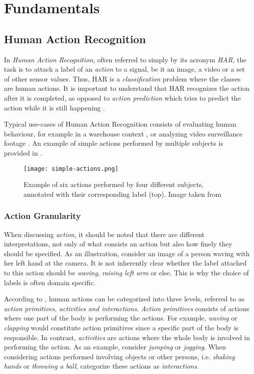 \chapter{Fundamentals}

\section{Human Action Recognition}
In \textit{Human Action Recognition}, often referred to simply by its acronym \textit{HAR}, the task is to attach a label of an \textit{action} to a signal, be it an image, a video or a set of other sensor values.
Thus, HAR is a \textit{classification} problem where the classes are human actions.
It is important to understand that HAR recognizes the action after it is completed, as opposed to \textit{action prediction} which tries to predict the action while it is still happening \cite{kong_human_2018}.

Typical use-cases of Human Action Recognition consists of evaluating human behaviour, for example in a warehouse context \cite{reining_towards_2018}, or analyzing video surveillance footage \cite{htike_human_2014}.
An example of simple actions performed by multiple subjects is provided in .

\begin{figure}[htb!]
    \centering
    \texttt{[image: simple-actions.png]}
    \caption{Example of six actions performed by four different subjects, annotated with their corresponding label (top). Image taken from \cite{laptev_learning_2008} }
    \label{fig:simple-actions}
\end{figure}

\subsection{Action Granularity}
When discussing \textit{action}, it should be noted that there are different interpretations, not only of what consists an action but also how finely they should be specified.
As an illustration, consider an image of a person waving with her left hand at the camera.
It is not inherently clear whether the label attached to this action should be \textit{waving}, \textit{raising left arm} or else.
This is why the choice of labels is often domain specific.

According to \cite{zhang_review_2017}, human actions can be categorized into three levels, referred to as \textit{action primitives, activities and interactions}.
\textit{Action primitives} consists of actions where one part of the body is performing the actions.
For example, \textit{waving} or \textit{clapping} would constitute action primitives since a specific part of the body is responsible.
In contrast, \textit{activities} are actions where the whole body is involved in performing the action.
As an example, consider \textit{jumping} or \textit{jogging}.
When considering actions performed involving objects or other persons, i.e. \textit{shaking hands} or \textit{throwing a ball}, \cite{zhang_review_2017} categorize these actions as \textit{interactions}.

